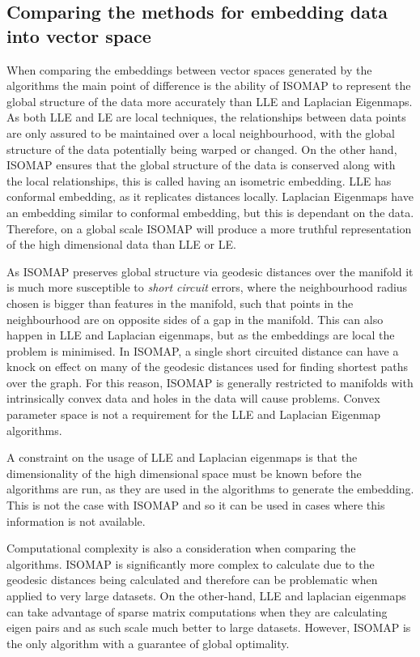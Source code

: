 \documentclass{article}
\begin{document}
\subsection{Comparing the methods for embedding data into vector space}
When comparing the embeddings between vector spaces generated by the algorithms the main point of difference is the ability of ISOMAP to represent the global structure of the data more accurately than LLE and Laplacian Eigenmaps. As both LLE and LE are local techniques, the relationships between data points are only assured to be maintained over a local neighbourhood, with the global structure of the data potentially being warped or changed. On the other hand, ISOMAP ensures that the global structure of the data is conserved along with the local relationships, this is called having an isometric embedding. LLE has conformal embedding, as it replicates distances locally. Laplacian Eigenmaps have an embedding similar to conformal embedding, but this is dependant on the data.\cite{cayton2005algorithms} Therefore, on a global scale ISOMAP will produce a more truthful representation of the high dimensional data than LLE or LE. 

As ISOMAP preserves global structure via geodesic distances over the manifold it is much more susceptible to \textit{short circuit} errors, where the neighbourhood radius chosen is bigger than features in the manifold, such that points in the neighbourhood are on opposite sides of a gap in the manifold. This can also happen in LLE and Laplacian eigenmaps, but as the embeddings are local the problem is minimised. In ISOMAP, a single short circuited distance can have a knock on effect on many of the geodesic distances used for finding shortest paths over the graph. For this reason, ISOMAP is generally restricted to manifolds with intrinsically convex data and holes in the data will cause problems. Convex parameter space is not a requirement for the LLE and Laplacian Eigenmap algorithms.

A constraint on the usage of LLE and Laplacian eigenmaps is that the dimensionality of the high dimensional space must be known before the algorithms are run, as they are used in the algorithms to generate the embedding. This is not the case with ISOMAP and so it can be used in cases where this information is not available. 

Computational complexity is also a consideration when comparing the algorithms. ISOMAP is significantly more complex to calculate due to the geodesic distances being calculated and therefore can be problematic when applied to very large datasets. On the other-hand, LLE and laplacian eigenmaps can take advantage of sparse matrix computations when they are calculating eigen pairs and as such scale much better to large datasets. However, ISOMAP is the only algorithm with a guarantee of global optimality.
\end{document}
